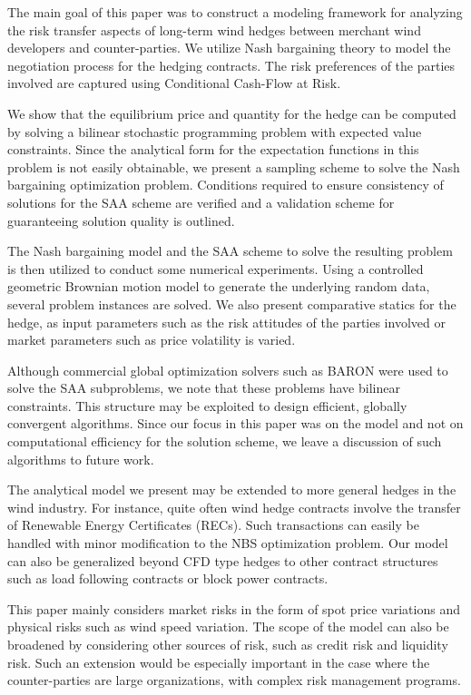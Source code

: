 The main goal of this paper was to construct a modeling framework for analyzing
the risk transfer aspects of long-term wind hedges between merchant wind
developers and counter-parties. We utilize Nash bargaining theory to model the
negotiation process for the hedging contracts. The risk preferences of the
parties involved are captured using Conditional Cash-Flow at Risk. 

We show that the equilibrium price and quantity for the hedge can be computed by
solving a bilinear stochastic programming problem with expected value
constraints. Since the analytical form for the expectation functions in this
problem is not easily obtainable, we present a sampling scheme to solve the Nash
bargaining optimization problem. Conditions required to ensure consistency of
solutions for the SAA scheme are verified and a validation scheme for
guaranteeing solution quality is outlined.

The Nash bargaining model and the SAA scheme to solve the resulting problem is
then utilized to conduct some numerical experiments. Using a controlled
geometric Brownian motion model to generate the underlying random data, several
problem instances are solved. We also present comparative
statics for the hedge, as input parameters such as the risk attitudes of the
parties involved or market parameters such as price volatility is varied. 

Although commercial global optimization solvers such as BARON were used to solve
the SAA subproblems, we note that these problems have bilinear constraints. This
structure may be exploited to design efficient, globally convergent algorithms.
Since our focus in this paper was on the model and not on computational
efficiency for the solution scheme, we leave a discussion of such algorithms to
future work.

The analytical model we present may be extended to more general hedges in the wind
industry. For instance, quite often wind hedge contracts involve the transfer of
Renewable Energy Certificates (RECs). Such transactions can easily be handled
with minor modification to the NBS optimization problem. Our model can also be
generalized beyond CFD type hedges to other contract structures such as load
following contracts or block power contracts.

This paper mainly considers market risks in the form of spot price variations
and physical risks such as wind speed variation. The scope of the model can also
be broadened by considering other sources of risk, such as credit risk and
liquidity risk. Such an extension would be especially important in the case
where the counter-parties are large organizations, with complex risk management
programs.


